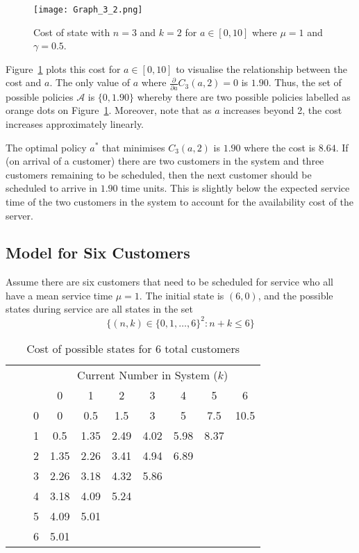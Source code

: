 \begin{figure}[htb]
	\centering
	\texttt{[image: Graph\_3\_2.png]}
	\caption{Cost of state with $n = 3$ and $k = 2$ for $a \in [0, 10]$ where $\mu = 1$ and $\gamma = 0.5$.}
	\label{Graph_3_2}
\end{figure}
Figure~\ref{Graph_3_2} plots this cost for $a \in [0, 10]$ to visualise the relationship between the cost and $a$. The only value of $a$ where $\frac{\partial}{\partial a} C_{3} (a, 2) = 0$ is $1.90$. Thus, the set of possible policies $\mathcal{A}$ is $\{ 0, 1.90 \}$ whereby there are two possible policies labelled as orange dots on Figure~\ref{Graph_3_2}. Moreover, note that as $a$ increases beyond 2, the cost increases approximately linearly.

The optimal policy $a^{*}$ that minimises $C_{3} (a, 2)$ is $1.90$ where the cost is $8.64$. If (on arrival of a customer) there are two customers in the system and three customers remaining to be scheduled, then the next customer should be scheduled to arrive in $1.90$ time units. This is slightly below the expected service time of the two customers in the system to account for the availability cost of the server.

\subsection{Model for Six Customers}
Assume there are six customers that need to be scheduled for service who all have a mean service time $\mu = 1$. The initial state is $(6, 0)$, and the possible states during service are all states in the set
\begin{equation}
	\Big\{ (n, k) \in \{ 0, 1, \ldots, 6 \}^{2} : n + k \leq 6 \Big\}
\end{equation}

\begin{table}[htb]
	\centering
	\begin{tabular}{c c c || c | c | c | c | c | c | c}
		& & & \multicolumn{7}{c}{Current Number in System ($k$)} \\
		& & & 0 & 1 & 2 & 3 & 4 & 5 & 6 \\ \hline \hline
		\parbox[t]{2mm}{} & \parbox[t]{2mm}{} & 0 & 0 & 0.5 & 1.5 & 3 & 5 & 7.5 & 10.5 \\
		& & 1 & 0.5 & 1.35 & 2.49 & 4.02 & 5.98 & 8.37 \\
		& & 2 & 1.35 & 2.26 & 3.41 & 4.94 & 6.89 & \\
		& & 3 & 2.26 & 3.18 & 4.32 & 5.86 & & \\
		& & 4 & 3.18 & 4.09 & 5.24 & & & \\
		& & 5 & 4.09 & 5.01 & & & & \\
		& & 6 & 5.01 & & & & &
	\end{tabular}
	\caption{Cost of possible states for 6 total customers}
	\label{Cost_6_Customers}
\end{table}

